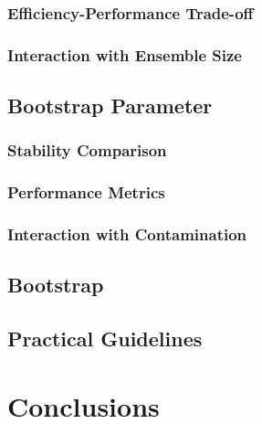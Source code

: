 \documentclass[10pt, conference]{IEEEtran}
\begin{document}


\subsubsection{Efficiency-Performance Trade-off}



\subsubsection{Interaction with Ensemble Size}




\subsection{Bootstrap Parameter}
\subsubsection{Stability Comparison}





\subsubsection{Performance Metrics}


\subsubsection{Interaction with Contamination}


\subsection{Bootstrap}

\subsection{Practical Guidelines}
\section{Conclusions}




\end{document}
